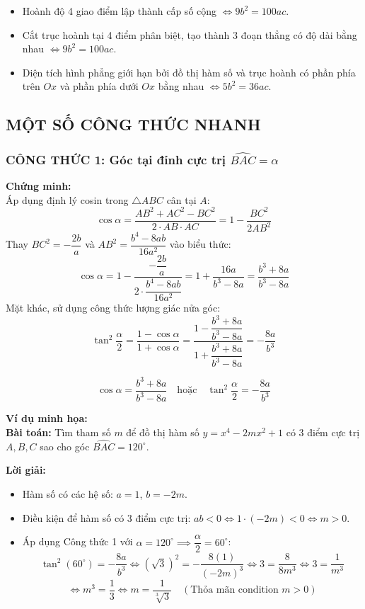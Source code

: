 \begin{itemize}
\begin{itemize}
    \item Hoành độ 4 giao điểm lập thành cấp số cộng $\Leftrightarrow 9b^2 = 100ac$.
    \item Cắt trục hoành tại 4 điểm phân biệt, tạo thành 3 đoạn thẳng có độ dài bằng nhau $\Leftrightarrow 9b^2 = 100ac$.
    \item Diện tích hình phẳng giới hạn bởi đồ thị hàm số và trục hoành có phần phía trên $Ox$ và phần phía dưới $Ox$ bằng nhau $\Leftrightarrow 5b^2 = 36ac$.
\end{itemize}
\subsection{MỘT SỐ CÔNG THỨC NHANH}
\subsubsection{CÔNG THỨC 1: Góc tại đỉnh cực trị $\widehat{BAC} = \alpha$}

\noindent \textbf{Chứng minh:} \\
Áp dụng định lý cosin trong $\triangle ABC$ cân tại $A$:
\[
\cos \alpha = \frac{AB^2 + AC^2 - BC^2}{2 \cdot AB \cdot AC} = 1 - \frac{BC^2}{2AB^2}
\]
Thay $BC^2 = -\dfrac{2b}{a}$ và $AB^2 = \dfrac{b^4 - 8ab}{16a^2}$ vào biểu thức:
\[
\cos \alpha = 1 - \frac{-\dfrac{2b}{a}}{2 \cdot \dfrac{b^4 - 8ab}{16a^2}} = 1 + \frac{16a}{b^3 - 8a} = \frac{b^3 + 8a}{b^3 - 8a}
\]
Mặt khác, sử dụng công thức lượng giác nửa góc:
\[
\tan^2 \frac{\alpha}{2} = \frac{1 - \cos \alpha}{1 + \cos \alpha} = \frac{1 - \dfrac{b^3 + 8a}{b^3 - 8a}}{1 + \dfrac{b^3 + 8a}{b^3 - 8a}} = -\frac{8a}{b^3}
\]

\begin{tcolorbox}[title=CÔNG THỨC GIẢI NHANH 1]
\[
\cos \alpha = \frac{b^3 + 8a}{b^3 - 8a} \quad \text{hoặc} \quad \tan^2 \frac{\alpha}{2} = -\frac{8a}{b^3}
\]
\end{tcolorbox}

\noindent \textbf{Ví dụ minh họa:} \\
\textbf{Bài toán:} Tìm tham số $m$ để đồ thị hàm số $y = x^4 - 2mx^2 + 1$ có 3 điểm cực trị $A, B, C$ sao cho góc $\widehat{BAC} = 120^\circ$.

\noindent \textbf{Lời giải:}
\begin{itemize}
    \item Hàm số có các hệ số: $a = 1$, $b = -2m$.
    \item Điều kiện để hàm số có 3 điểm cực trị: $ab < 0 \iff 1 \cdot (-2m) < 0 \iff m > 0$.
    \item Áp dụng Công thức 1 với $\alpha = 120^\circ \implies \dfrac{\alpha}{2} = 60^\circ$:
    \[
    \tan^2(60^\circ) = -\frac{8a}{b^3} \iff (\sqrt{3})^2 = -\frac{8(1)}{(-2m)^3} \iff 3 = \frac{8}{8m^3} \iff 3 = \frac{1}{m^3}
    \]
    \[
    \iff m^3 = \frac{1}{3} \iff m = \frac{1}{\sqrt[3]{3}} \quad (\text{Thỏa mãn condition } m > 0)
    \]
\end{itemize}


\end{itemize}
